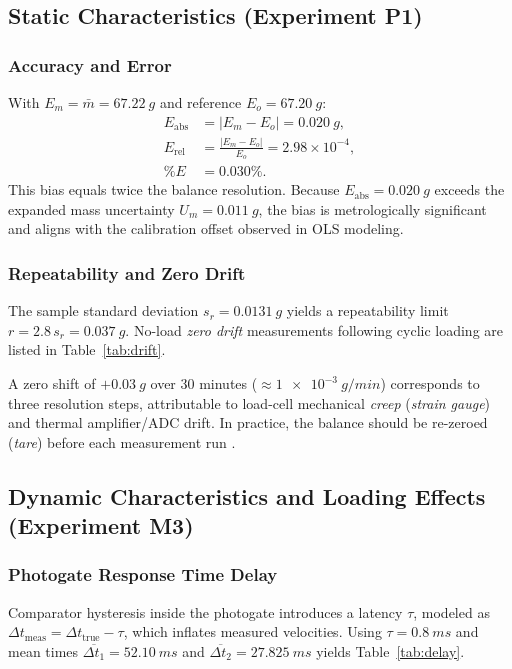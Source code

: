 \documentclass[a4paper, 12pt]{article}
\begin{document}
\subsection{Static Characteristics (Experiment P1)}
            \subsubsection{Accuracy and Error}
            With $E_m=\bar{m}=\SI{67.22}{g}$ and reference $E_o=\SI{67.20}{g}$:
            \begin{align}
                E_{\mathrm{abs}} &= |E_m-E_o|=\SI{0.020}{g},\\
                E_{\mathrm{rel}} &= \frac{|E_m-E_o|}{E_o}=2.98\times10^{-4},\\
                \%E &= 0.030\%.
            \end{align}
            This bias equals twice the balance resolution. Because $E_{\mathrm{abs}}=\SI{0.020}{g}$ exceeds the expanded mass uncertainty $U_m=\SI{0.011}{g}$, the bias is metrologically significant and aligns with the calibration offset observed in OLS modeling.

            \subsubsection{Repeatability and Zero Drift}
            The sample standard deviation $s_r=\SI{0.0131}{g}$ yields a repeatability limit $r=2.8\,s_r=\SI{0.037}{g}$. No-load \textit{zero drift} measurements following cyclic loading are listed in Table~\ref{tab:drift}.

            A zero shift of $+\SI{0.03}{g}$ over $30$ minutes ($\approx\SI{1e-3}{g/min}$) corresponds to three resolution steps, attributable to load-cell mechanical \textit{creep} (\textit{strain gauge}) and thermal amplifier/ADC drift. In practice, the balance should be re-zeroed (\textit{tare}) before each measurement run \parencite{MorrisLangari}.

        \subsection{Dynamic Characteristics and Loading Effects (Experiment M3)}
            \subsubsection{Photogate Response Time Delay}
            Comparator hysteresis inside the photogate introduces a latency $\tau$, modeled as $\Delta t_{\mathrm{meas}}=\Delta t_{\mathrm{true}}-\tau$, which inflates measured velocities. Using $\tau=\SI{0.8}{ms}$ and mean times $\overline{\Delta t_1}=\SI{52.10}{ms}$ and $\overline{\Delta t_2}=\SI{27.825}{ms}$ yields Table~\ref{tab:delay}.
\end{document}
